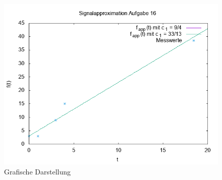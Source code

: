     \begin{figure}
        \includegraphics[width=\textwidth]{A16_plot.png}
        \caption{Grafische Darstellung}
    \end{figure}


